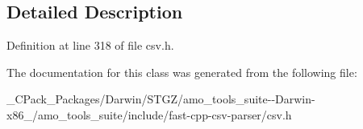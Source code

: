 \subsection{Detailed Description}


Definition at line 318 of file csv.\+h.



The documentation for this class was generated from the following file\+:\begin{DoxyCompactItemize}
\item 
\+\_\+\+C\+Pack\+\_\+\+Packages/\+Darwin/\+S\+T\+G\+Z/amo\+\_\+tools\+\_\+suite-\/-\/\+Darwin-\/x86\+\_/amo\+\_\+tools\+\_\+suite/include/fast-\/cpp-\/csv-\/parser/csv.\+h\end{DoxyCompactItemize}
